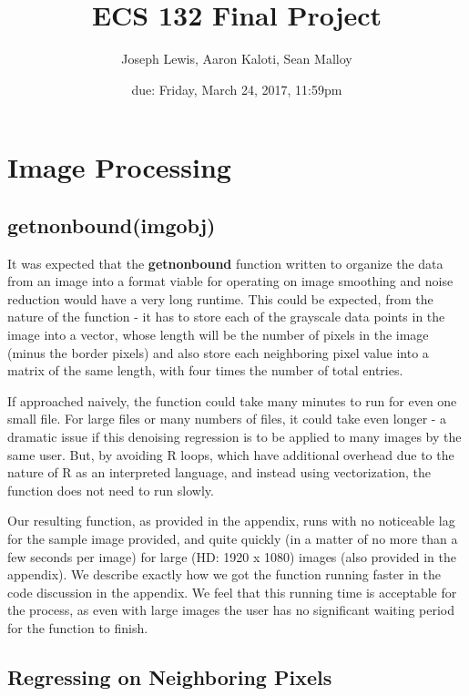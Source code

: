 \documentclass{article}
\title{ECS 132 Final Project}
\author{Joseph Lewis, Aaron Kaloti, Sean Malloy}
\date{due: Friday, March 24, 2017, 11:59pm}
\begin{document}
\maketitle

\tableofcontents  %

\newpage
\section{Image Processing}

\subsection{getnonbound(imgobj)}

It was expected that the \textbf{getnonbound} function written to organize the data from an image into a format viable for operating on image smoothing and noise reduction would have a very long runtime.  This could be expected, from the nature of the function - it has to store each of the grayscale data points in the image into a vector, whose length will be the number of pixels in the image (minus the border pixels) and also store each neighboring pixel value into a matrix of the same length, with four times the number of total entries.

If approached naively, the function could take many minutes to run for even one small file.  For large files or many numbers of files, it could take even longer - a dramatic issue if this denoising regression is to be applied to many images by the same user.  But, by avoiding R loops, which have additional overhead due to the nature of R as an interpreted language, and instead using vectorization, the function does not need to run slowly.

Our resulting function, as provided in the appendix, runs with no noticeable lag for the sample image provided, and quite quickly (in a matter of no more than a few seconds per image) for large (HD: 1920 x 1080) images (also provided in the appendix).  We describe exactly how we got the function running faster in the code discussion in the appendix.  We feel that this running time is acceptable for the process, as even with large images the user has no significant waiting period for the function to finish. 

\subsection{Regressing on Neighboring Pixels}
\end{document}
